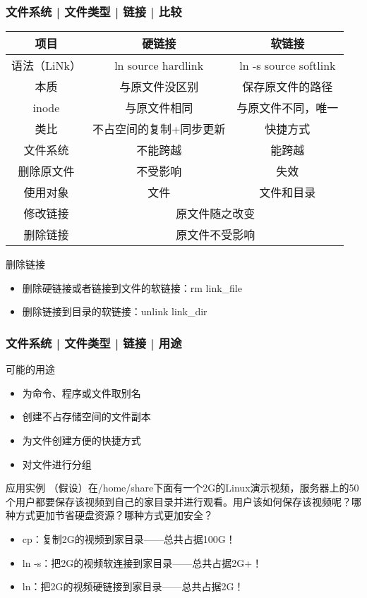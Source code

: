 \begin{frame}
  \frametitle{文件系统 | 文件类型 | 链接 | \alert{比较}}
  \begin{table}
    \centering
    \begin{tabularx}{0.94\textwidth}{ccc}
      \hline
      \rowcolor{blue!50}项目 & 硬链接 & 软链接\\
      \hline
      语法（LiNk） & ln source hardlink & ln -s source softlink\\
      本质 & 与原文件没区别 & 保存原文件的路径\\
      inode & 与原文件相同 & 与原文件不同，唯一\\
      类比 & 不占空间的复制+同步更新 & 快捷方式\\
      文件系统 & 不能跨越 & 能跨越\\
      删除原文件 & 不受影响 & 失效\\
      使用对象 & 文件 & 文件和目录\\
      \hline
      修改链接 & \multicolumn{2}{c}{原文件随之改变}\\
      删除链接 & \multicolumn{2}{c}{原文件不受影响}\\
      \hline
    \end{tabularx}
  \end{table}
  \pause
  \begin{block}{删除链接}
    \begin{itemize}
      \item 删除硬链接或者链接到文件的软链接：rm link\_file
      \item 删除链接到目录的软链接：unlink link\_dir
    \end{itemize}
  \end{block}
\end{frame}

\begin{frame}
  \frametitle{文件系统 | 文件类型 | 链接 | 用途}
  \begin{block}{可能的用途}
  \begin{itemize}
    \item 为命令、程序或文件取别名
    \item 创建不占存储空间的文件副本
    \item 为文件创建方便的快捷方式
    \item 对文件进行分组
  \end{itemize}
  \end{block}
  \pause
  \begin{block}{应用实例}
    （假设）在/home/share下面有一个2G的Linux演示视频，服务器上的50个用户都要保存该视频到自己的家目录并进行观看。用户该如何保存该视频呢？哪种方式更加节省硬盘资源？哪种方式更加安全？
    \begin{itemize}
      \item cp：复制2G的视频到家目录——总共占据100G！
      \item ln -s：把2G的视频软连接到家目录——总共占据2G+！
      \item ln：把2G的视频硬链接到家目录——总共占据2G！
    \end{itemize}
  \end{block}
\end{frame}

